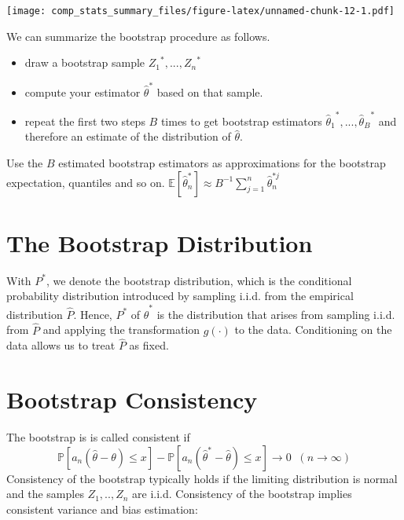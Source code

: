 \documentclass[]{book}
\providecommand{\tightlist}{%
  \setlength{\itemsep}{0pt}\setlength{\parskip}{0pt}}
\begin{document}
\texttt{[image: comp\_stats\_summary\_files/figure-latex/unnamed-chunk-12-1.pdf]}

We can summarize the bootstrap procedure as follows.

\begin{itemize}
\tightlist
\item
  draw a bootstrap sample \({Z_1}^{*}, ..., {Z_{n}}^{*}\)
\item
  compute your estimator \({\hat{\theta}}^*\) based on that sample.
\item
  repeat the first two steps \(B\) times to get bootstrap estimators
  \({\hat{\theta}_1}^*, ..., {\hat{\theta}_B}^*\) and therefore an
  estimate of the distribution of \(\hat{\theta}\).
\end{itemize}

Use the \(B\) estimated bootstrap estimators as approximations for the
bootstrap expectation, quantiles and so on.
\(\mathbb{E}[\hat{\theta}^*_n] \approx B^{-1}\sum\limits_{j = 1}^n \hat{\theta}^{* j}_n\)

\section{The Bootstrap Distribution}\label{the-bootstrap-distribution}

With \(P^*\), we denote the bootstrap distribution, which is the
conditional probability distribution introduced by sampling i.i.d. from
the empirical distribution \(\hat{P}\). Hence, \(P^*\) of
\({\hat{\theta}}^*\) is the distribution that arises from sampling
i.i.d. from \(\hat{P}\) and applying the transformation \(g(\cdot)\) to
the data. Conditioning on the data allows us to treat \(\hat{P}\) as
fixed.

\section{Bootstrap Consistency}\label{bootstrap-consistency}

The bootstrap is is called consistent if
\[ \mathbb{P}[a_n(\hat{\theta} - \theta) \leq x ] - \mathbb{P}[a_n(\hat{\theta}^* - \hat{\theta}) \leq x ] \rightarrow 0 \;\; (n \rightarrow \infty)\]
Consistency of the bootstrap typically holds if the limiting
distribution is normal and the samples \(Z_1, .., Z_n\) are i.i.d.
Consistency of the bootstrap implies consistent variance and bias
estimation:
\end{document}
